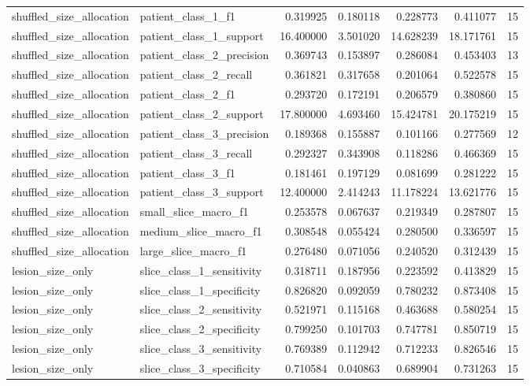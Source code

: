 \begin{tabular}{llrrrrr}
shuffled_size_allocation & patient_class_1_f1 & 0.319925 & 0.180118 & 0.228773 & 0.411077 & 15 \\
shuffled_size_allocation & patient_class_1_support & 16.400000 & 3.501020 & 14.628239 & 18.171761 & 15 \\
shuffled_size_allocation & patient_class_2_precision & 0.369743 & 0.153897 & 0.286084 & 0.453403 & 13 \\
shuffled_size_allocation & patient_class_2_recall & 0.361821 & 0.317658 & 0.201064 & 0.522578 & 15 \\
shuffled_size_allocation & patient_class_2_f1 & 0.293720 & 0.172191 & 0.206579 & 0.380860 & 15 \\
shuffled_size_allocation & patient_class_2_support & 17.800000 & 4.693460 & 15.424781 & 20.175219 & 15 \\
shuffled_size_allocation & patient_class_3_precision & 0.189368 & 0.155887 & 0.101166 & 0.277569 & 12 \\
shuffled_size_allocation & patient_class_3_recall & 0.292327 & 0.343908 & 0.118286 & 0.466369 & 15 \\
shuffled_size_allocation & patient_class_3_f1 & 0.181461 & 0.197129 & 0.081699 & 0.281222 & 15 \\
shuffled_size_allocation & patient_class_3_support & 12.400000 & 2.414243 & 11.178224 & 13.621776 & 15 \\
shuffled_size_allocation & small_slice_macro_f1 & 0.253578 & 0.067637 & 0.219349 & 0.287807 & 15 \\
shuffled_size_allocation & medium_slice_macro_f1 & 0.308548 & 0.055424 & 0.280500 & 0.336597 & 15 \\
shuffled_size_allocation & large_slice_macro_f1 & 0.276480 & 0.071056 & 0.240520 & 0.312439 & 15 \\
lesion_size_only & slice_class_1_sensitivity & 0.318711 & 0.187956 & 0.223592 & 0.413829 & 15 \\
lesion_size_only & slice_class_1_specificity & 0.826820 & 0.092059 & 0.780232 & 0.873408 & 15 \\
lesion_size_only & slice_class_2_sensitivity & 0.521971 & 0.115168 & 0.463688 & 0.580254 & 15 \\
lesion_size_only & slice_class_2_specificity & 0.799250 & 0.101703 & 0.747781 & 0.850719 & 15 \\
lesion_size_only & slice_class_3_sensitivity & 0.769389 & 0.112942 & 0.712233 & 0.826546 & 15 \\
lesion_size_only & slice_class_3_specificity & 0.710584 & 0.040863 & 0.689904 & 0.731263 & 15 \\

\end{tabular}
